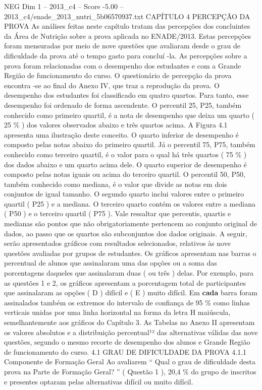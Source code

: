 \begin{textsample}{NEG Dim 1 – 2013\_c4 – Score -5.00 – 2013\_c4/enade\_2013\_nutri\_5b06570937.txt}  \label{ex:f1_neg_051}
CAPÍTULO 4 PERCEPÇÃO DA PROVA As análises feitas neste capítulo tratam das percepções dos concluintes da Área de Nutrição sobre a prova aplicada no ENADE/2013.
Estas percepções foram mensuradas por meio de nove questões que avaliaram desde o grau de dificuldade da prova até o tempo gasto para concluí -la.
As percepções sobre a prova foram relacionadas com o desempenho dos estudantes e com a Grande Região de funcionamento do curso.
O questionário de percepção da prova encontra -se ao final do Anexo IV, que traz a reprodução da prova.
O desempenho dos estudantes foi classificado em quatro quartos.
Para tanto, esse desempenho foi ordenado de forma ascendente.
O percentil 25, P25, também conhecido como primeiro quartil, é a nota de desempenho que deixa um quarto ( 25 \% ) dos valores observados abaixo e três quartos acima.
A Figura 4.1 apresenta uma ilustração deste conceito.
O quarto inferior de desempenho é composto pelas notas abaixo do primeiro quartil.
Já o percentil 75, P75, também conhecido como terceiro quartil, é o valor para o qual há três quartos ( 75 \% ) dos dados abaixo e um quarto acima dele.
O quarto superior de desempenho é composto pelas notas iguais ou acima do terceiro quartil.
O percentil 50, P50, também conhecido como mediana, é o valor que divide as notas em dois conjuntos de igual tamanho.
O segundo quarto inclui valores entre o primeiro quartil ( P25 ) e a mediana.
O terceiro quarto contém os valores entre a mediana ( P50 ) e o terceiro quartil ( P75 ).
Vale ressaltar que percentis, quartis e medianas são pontos que não obrigatoriamente pertencem ao conjunto original de dados, ao passo que os quartos são subconjuntos dos dados originais.
A seguir, serão apresentados gráficos com resultados selecionados, relativos às nove questões avaliadas por grupos de estudantes.
Os gráficos apresentam nas barras o percentual de alunos que assinalaram uma das opções ou a soma das porcentagens daqueles que assinalaram duas ( ou três ) delas.
Por exemplo, para as questões 1 e 2, os gráficos apresentam a porcentagem total de participantes que assinalaram as opções ( D ) difícil e ( E ) muito difícil.
Em \textbf{cada} barra foram assinalados também os extremos do intervalo de confiança de 95 \% como linhas verticais unidas por uma linha horizontal na forma da letra H maiúscula, semelhantemente aos gráficos do Capítulo 3.
As Tabelas no Anexo II apresentam os valores absolutos e a distribuição percentual¹² das alternativas válidas das nove questões, segundo o mesmo recorte de desempenho dos alunos e Grande Região de funcionamento do curso. 4.1 GRAU DE DIFICULDADE DA PROVA 4.1.1 Componente de Formação Geral Ao avaliarem “ Qual o grau de dificuldade desta prova na Parte de Formação Geral? ” ( Questão 1 ), 20,4 \% do grupo de inscritos e presentes optaram pelas alternativas difícil ou muito difícil.

\end{textsample}
